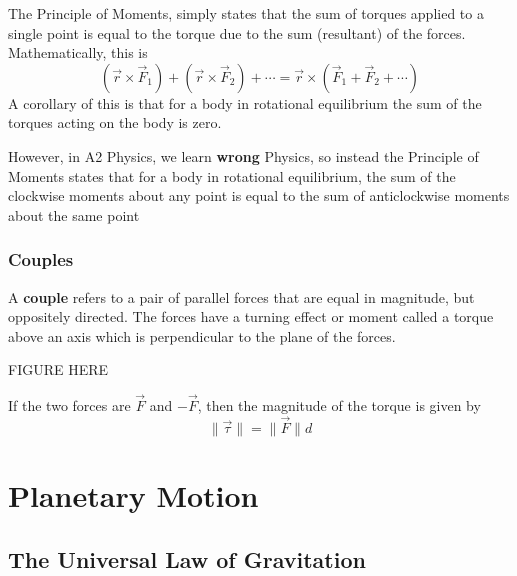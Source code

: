 The Principle of Moments, simply states that the sum of torques applied to a single point is equal to the torque due to the sum (resultant) of the forces. Mathematically, this is
\begin{equation}
    (\vec{r} \times \vec{F}_1) + (\vec{r} \times \vec{F}_2) + \cdots = \vec{r} \times (\vec{F}_1 + \vec{F}_2 + \cdots)
\end{equation}
A corollary of this is that for a body in rotational equilibrium the sum of the torques acting on the body is zero. 

However, in A2 Physics, we learn \textbf{wrong} Physics, so instead the Principle of Moments states that for a body in rotational equilibrium, the sum of the clockwise moments about any point is equal to the sum of anticlockwise moments about the same point 

\subsubsection*{Couples}

A \textbf{couple} refers to a pair of parallel forces that are equal in magnitude, but oppositely directed. The forces have a turning effect or moment called a torque above an axis which is perpendicular to the plane of the forces. 

FIGURE HERE

If the two forces are $\vec{F}$ and $-\vec{F}$, then the magnitude of the torque is given by
\begin{equation}
    \| \vec{\tau} \| = \| \vec{F} \| d
\end{equation}


\section{Planetary Motion}

\subsection{The Universal Law of Gravitation}

